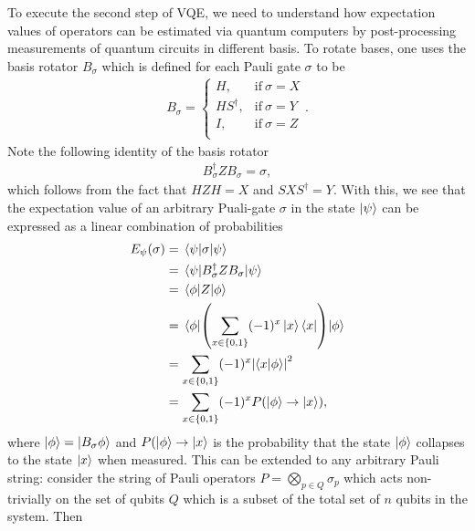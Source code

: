\documentclass[10pt]{article}
\begin{document}
To execute the second step of VQE, we need to understand how expectation values of operators can be estimated via quantum computers by post-processing measurements of quantum circuits in different basis. To rotate bases, one uses the basis rotator $B_\sigma$ which is defined for each Pauli gate $\sigma$ to be
\begin{align}
B_{\sigma} =
\begin{cases}
H, & \text{if} \ \sigma = X \\
HS^{\dagger}, & \text{if} \ \sigma = Y \\
I, & \text{if} \ \sigma = Z \\
\end{cases}
.\end{align}
Note the following identity of the basis rotator
\begin{align}
B^\dagger_\sigma Z B_\sigma = \sigma
,\end{align}
which follows from the fact that $HZH=X$ and $SXS^\dagger=Y$. With this, we see that the expectation value of an arbitrary Puali-gate $\sigma$ in the state $\ket{\psi}$ can be expressed as a linear combination of probabilities
\begin{align}
E_{\psi}(\sigma)
&= \mel{\psi}{\sigma}{\psi} \nonumber \\
&=\mel{\psi}{B_{\sigma}^{\dagger}ZB_{\sigma}}{\psi} \nonumber \\
&=\mel{\phi}{Z}{\phi} \nonumber \\
&=\mel{\phi}{\left(\sum_{x\in\{0,1\}}(-1)^x\ket{x}\bra{x}\right)}{\phi} \nonumber \\
&=\sum_{x\in\{0,1\}}(-1)^x\abs{\bra{x}\ket{\phi}}^2\nonumber \\
&=\sum_{x\in\{0,1\}}(-1)^xP(\ket{\phi}\to\ket{x})
,\end{align}
where $\ket{\phi}=\ket{B_\sigma\phi}$ and $P(\ket{\phi}\to\ket{x}$ is the probability that the state $\ket{\phi}$ collapses to the state $\ket{x}$ when measured. This can be extended to any arbitrary Pauli string: consider the string of Pauli operators $P=\bigotimes_{p\in Q}\sigma_p$ which acts non-trivially on the set of qubits $Q$ which is a subset of the total set of $n$ qubits in the system. Then 
\end{document}
